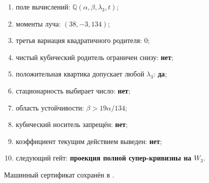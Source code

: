 \begin{protocol}
\begin{enumerate}
 \item поле вычислений:
       \textbf{$\mathbb Q(\alpha,\beta,\lambda_3,t)$};
 \item моменты луча: \textbf{$(38,-3,134)$};
 \item третья вариация квадратичного родителя: \textbf{$0$};
 \item чистый кубический родитель ограничен снизу: \textbf{нет};
 \item положительная квартика допускает любой $\lambda_3$: \textbf{да};
 \item стационарность выбирает число: \textbf{нет};
 \item область устойчивости: \textbf{$\beta>19\alpha/134$};
 \item кубический носитель запрещён: \textbf{нет};
 \item коэффициент текущим действием выведен: \textbf{нет};
 \item следующий гейт:
       \textbf{проекция полной супер-кривизны на $W_3$}.
\end{enumerate}
\end{protocol}

Машинный сертификат сохранён в
.